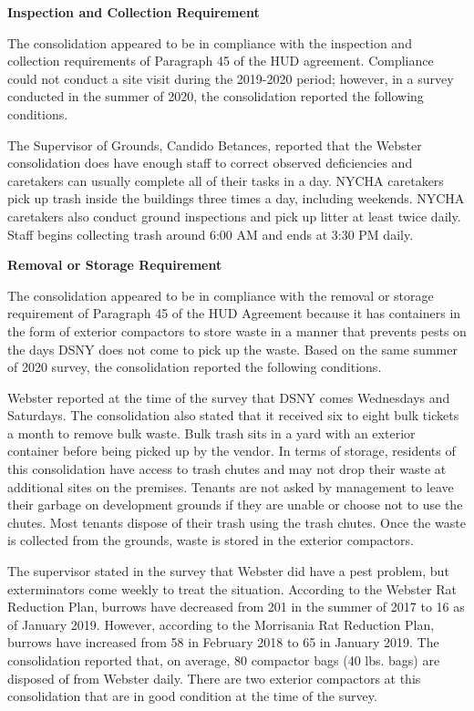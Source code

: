 
\textbf{Inspection and Collection Requirement}

The consolidation appeared to be in compliance with the inspection and collection requirements of Paragraph 45 of the HUD agreement. Compliance could not conduct a site visit during the 2019-2020 period; however, in a survey conducted in the summer of 2020, the consolidation reported the following conditions.

The Supervisor of Grounds, Candido Betances, reported that the Webster consolidation does have enough staff to correct observed deficiencies and caretakers can usually complete all of their tasks in a day. NYCHA caretakers pick up trash inside the buildings three times a day, including weekends. NYCHA caretakers also conduct ground inspections and pick up litter at least twice daily. Staff begins collecting trash around 6:00 AM and ends at 3:30 PM daily. 

\textbf{Removal or Storage Requirement}

The consolidation appeared to be in compliance with the removal or storage requirement of Paragraph  45 of the HUD Agreement because it has containers in the form of exterior compactors to store waste in a manner that prevents pests on the days DSNY does not come to pick up the waste. Based on the same summer of  2020 survey, the consolidation reported the following conditions.

Webster reported at the time of the survey that DSNY comes Wednesdays and Saturdays. The consolidation also stated that it received six to eight bulk tickets a month to remove bulk waste. Bulk trash sits in a yard with an exterior container before being picked up by the vendor. In terms of storage, residents of this consolidation have access to trash chutes and may not drop their waste at additional sites on the premises. Tenants are not asked by management to leave their garbage on development grounds if they are unable or choose not to use the chutes. Most tenants dispose of their trash using the trash chutes. Once the waste is collected from the grounds, waste is stored in the exterior compactors.  

The supervisor stated in the survey that Webster did have a pest problem, but exterminators come weekly to treat the situation. According to the Webster Rat Reduction Plan, burrows have decreased from 201 in the summer of 2017 to 16 as of January 2019. However, according to the Morrisania Rat Reduction Plan, burrows have increased from 58 in February 2018 to 65 in January 2019. The consolidation reported that, on average, 80 compactor bags (40 lbs. bags) are disposed of from Webster daily. There are two exterior compactors at this consolidation that are in good condition at the time of the survey.

